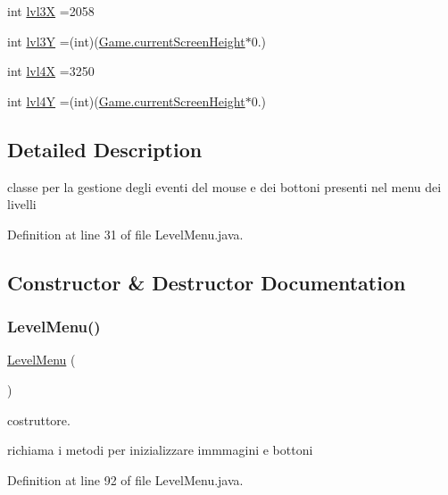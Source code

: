 \begin{DoxyCompactItemize}
int \hyperlink{classui_1_1_level_menu_acfc9117f336907e6204ab7e7abfc9ba8}{lvl3X} =2058
\item 
int \hyperlink{classui_1_1_level_menu_a996daa7186e7d5e32600f8634d605bbc}{lvl3Y} =(int)(\hyperlink{classprogetto_1_1_game_a1aca3161d2e02e5dc13bb3cae83a8ad1}{Game.\+current\+Screen\+Height}$\ast$0.)
\item 
int \hyperlink{classui_1_1_level_menu_ab04c837988047c02371c20cb54a61ee7}{lvl4X} =3250
\item 
int \hyperlink{classui_1_1_level_menu_a585947c0e0993df3bd65e9a4dc7e5d0f}{lvl4Y} =(int)(\hyperlink{classprogetto_1_1_game_a1aca3161d2e02e5dc13bb3cae83a8ad1}{Game.\+current\+Screen\+Height}$\ast$0.)
\end{DoxyCompactItemize}


\subsection{Detailed Description}
classe per la gestione degli eventi del mouse e dei bottoni presenti nel menu dei livelli 

Definition at line 31 of file Level\+Menu.\+java.



\subsection{Constructor \& Destructor Documentation}
\mbox{\label{classui_1_1_level_menu_a08d3dc37d2a120ac517986d021c999c0}} 
\subsubsection{\texorpdfstring{Level\+Menu()}{LevelMenu()}}
{\footnotesize\ttfamily \hyperlink{classui_1_1_level_menu}{Level\+Menu} (\begin{DoxyParamCaption}{ }\end{DoxyParamCaption})}



costruttore. 

richiama i metodi per inizializzare immmagini e bottoni 

Definition at line 92 of file Level\+Menu.\+java.

